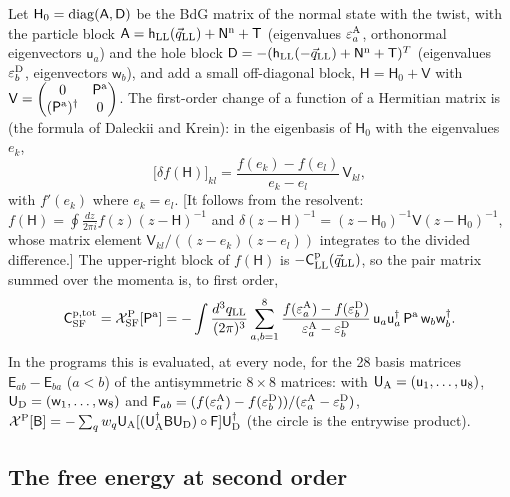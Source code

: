 \documentclass[aps,prd,onecolumn,superscriptaddress,nofootinbib,floatfix,longbibliography]{revtex4-2}
\newcommand{\LL}{{\rm LL}}
\newcommand{\SF}{{\rm SF}}
\begin{document}
Let $\mathsf H_0={\rm diag}(\mathsf A,\mathsf D)$ be the BdG matrix of the normal state with the twist, with the particle block
$\mathsf A=\mathsf h_\LL(\vec q_\LL)+\mathsf N^{\rm n}+\mathsf T$ (eigenvalues $\varepsilon^{\rm A}_a$, orthonormal eigenvectors $\mathsf u_a$) and the hole
block $\mathsf D=-(\mathsf h_\LL(-\vec q_\LL)+\mathsf N^{\rm n}+\mathsf T)^T$ (eigenvalues $\varepsilon^{\rm D}_b$, eigenvectors $\mathsf w_b$), and add a small
off-diagonal block, $\mathsf H=\mathsf H_0+\mathsf V$ with $\mathsf V=\begin{pmatrix}0&\mathsf P^{\rm a}\\(\mathsf P^{\rm a})^\dagger&0\end{pmatrix}$. The first-order
change of a function of a Hermitian matrix is (the formula of Daleckii and Krein): in the eigenbasis of $\mathsf H_0$ with the
eigenvalues $e_k$,
\begin{equation}
\big[\delta f(\mathsf H)\big]_{kl}=\frac{f(e_k)-f(e_l)}{e_k-e_l}\,\mathsf V_{kl},
\label{eq:dk}
\end{equation}
with $f'(e_k)$ where $e_k=e_l$. [It follows from the resolvent: $f(\mathsf H)=\oint\frac{dz}{2\pi i}f(z)(z-\mathsf H)^{-1}$ and
$\delta(z-\mathsf H)^{-1}=(z-\mathsf H_0)^{-1}\mathsf V(z-\mathsf H_0)^{-1}$, whose matrix element $\mathsf V_{kl}/((z-e_k)(z-e_l))$ integrates to the
divided difference.] The upper-right block of $f(\mathsf H)$ is $-\mathsf C^{\rm p}_\LL(\vec q_\LL)$, so the pair matrix summed over the momenta
is, to first order,
\begin{equation}
\mathsf C^{\rm p,tot}_\SF=\mathcal X^{\rm P}_\SF[\mathsf P^{\rm a}]=-\int\frac{d^3q_\LL}{(2\pi)^3}\sum_{a,b=1}^8\frac{f(\varepsilon^{\rm A}_a)-f(\varepsilon^{\rm D}_b)}{\varepsilon^{\rm A}_a-\varepsilon^{\rm D}_b}\,\mathsf u_a\mathsf u_a^\dagger\,\mathsf P^{\rm a}\,\mathsf w_b\mathsf w_b^\dagger .
\label{eq:chi}
\end{equation}
In the programs this is evaluated, at every node, for the 28 basis matrices $\mathsf E_{ab}-\mathsf E_{ba}$ ($a<b$) of the antisymmetric
$8\times8$ matrices: with $\mathsf U_{\rm A}=(\mathsf u_1,\dots,\mathsf u_8)$, $\mathsf U_{\rm D}=(\mathsf w_1,\dots,\mathsf w_8)$ and
$\mathsf F_{ab}=(f(\varepsilon^{\rm A}_a)-f(\varepsilon^{\rm D}_b))/(\varepsilon^{\rm A}_a-\varepsilon^{\rm D}_b)$, $\mathcal X^{\rm P}[\mathsf B]=-\sum_qw_q\mathsf U_{\rm A}
[(\mathsf U_{\rm A}^\dagger\mathsf B\mathsf U_{\rm D})\circ\mathsf F]\mathsf U_{\rm D}^\dagger$ (the circle is the entrywise product).

\subsection{The free energy at second order}
\end{document}

